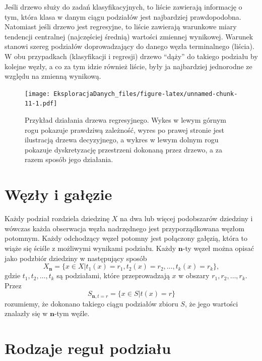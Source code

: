 \documentclass[]{book}
\theoremstyle{plain}
\theoremstyle{definition}
\begin{document}
Jeśli drzewo służy do zadań klasyfikacyjnych, to liście zawierają informację o tym, która klasa w danym ciągu podziałów jest najbardziej prawdopodobna. Natomiast jeśli drzewo jest regresyjne, to liście zawierają warunkowe miary tendencji centralnej (najczęściej średnią) wartości zmiennej wynikowej. Warunek stanowi szereg podziałów doprowadzający do danego węzła terminalnego (liścia). W obu przypadkach (klasyfikacji i regresji) drzewo ``dąży'' do takiego podziału by kolejne węzły, a co za tym idzie również liście, były ja najbardziej jednorodne ze względu na zmienną wynikową.

\begin{figure}
\centering
\texttt{[image: EksploracjaDanych\_files/figure-latex/unnamed-chunk-11-1.pdf]}
\caption{\label{fig:unnamed-chunk-11}Przykład działania drzewa regresyjnego. Wykes w lewym górnym rogu pokazuje prawdziwą zależność, wyres po prawej stronie jest ilustracją drzewa decyzyjnego, a wykres w lewym dolnym rogu pokazuje dyskretyzację przestrzeni dokonaną przez drzewo, a za razem sposób jego działania.}
\end{figure}

\hypertarget{wezy-i-gaezie}{%
\section{Węzły i gałęzie}\label{wezy-i-gaezie}}

Każdy podział rozdziela dziedzinę \(X\) na dwa lub więcej podobszarów dziedziny i wówczas każda obserwacja węzła nadrzędnego jest przyporządkowana węzłom potomnym. Każdy odchodzący węzeł potomny jest połączony gałęzią, która to wiąże się ściśle z możliwymi wynikami podziału. Każdy \(\mathbf{n}\)-ty węzeł można opisać jako podzbiór dziedziny w następujący sposób
\begin{equation}
    X_{\mathbf{n}}=\{x\in X|t_1(x)=r_1,t_2(x)=r_2,\ldots,t_k(x)=r_k\},
\end{equation}
gdzie \(t_1,t_2,\ldots,t_k\) są podziałami, które przeprowadzają \(x\) w obszary \(r_1, r_2,\ldots, r_k\). Przez
\begin{equation}
    S_{\mathbf{n}, t=r}=\{x\in S|t(x)=r\}
\end{equation}
rozumiemy, że dokonano takiego ciągu podziałów zbioru \(S\), że jego wartości znalazły się w \(\mathbf{n}\)-tym węźle.

\hypertarget{rodzaje-regu-podziau}{%
\section{Rodzaje reguł podziału}\label{rodzaje-regu-podziau}}
\end{document}
